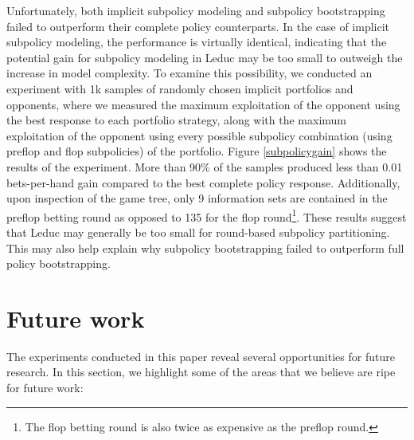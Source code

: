 \documentclass{aamas2013}
\begin{document}
Unfortunately, both implicit subpolicy modeling and subpolicy bootstrapping failed to outperform their complete policy counterparts. In the case of implicit subpolicy modeling, the performance is virtually identical, indicating that the potential gain for subpolicy modeling in Leduc may be too small to outweigh the increase in model complexity. To examine this possibility, we conducted an experiment with 1k samples of randomly chosen implicit portfolios and opponents, where we measured the maximum exploitation of the opponent using the best response to each portfolio strategy, along with the maximum exploitation of the opponent using every possible subpolicy combination (using preflop and flop subpolicies) of the portfolio. Figure \ref{subpolicygain} shows the results of the experiment. More than 90\% of the samples produced less than 0.01 bets-per-hand gain compared to the best complete policy response. Additionally, upon inspection of the game tree, only 9 information sets are contained in the preflop betting round as opposed to 135 for the flop round\footnote{The flop betting round is also twice as expensive as the preflop round.}. These results suggest that Leduc may generally be too small for round-based subpolicy partitioning. This may also help explain why subpolicy bootstrapping failed to outperform full policy bootstrapping.

\section{Future work}
The experiments conducted in this paper reveal several opportunities for future research. In this section, we highlight some of the areas that we believe are ripe for future work:
\end{document}
